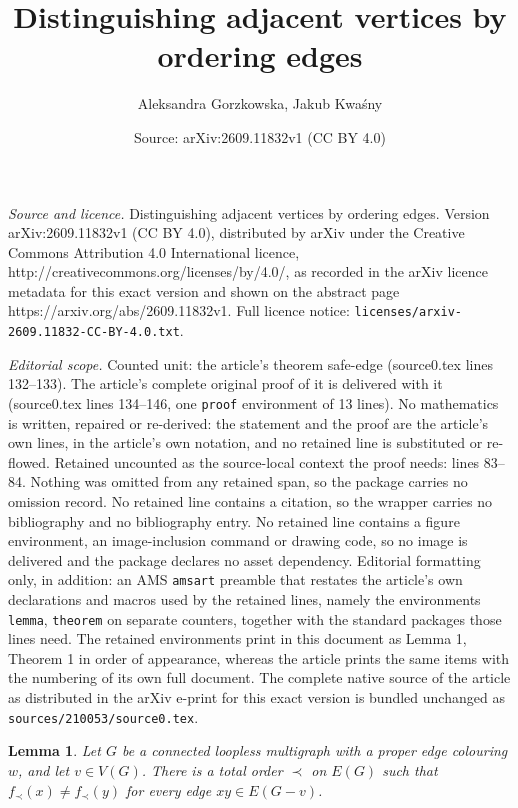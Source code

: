 \documentclass[10pt,a4paper]{amsart}
\title{Distinguishing adjacent vertices by ordering edges}
\author{Aleksandra Gorzkowska, Jakub Kwa\'sny}
\date{Source: arXiv:2609.11832v1 (CC BY 4.0)}
\newtheorem{lemma}{Lemma}
\begin{document}
\maketitle

\noindent\emph{Source and licence.} Distinguishing adjacent vertices by ordering edges. Version arXiv:2609.11832v1 (CC BY 4.0), distributed by arXiv under the Creative Commons Attribution 4.0 International licence, http://creativecommons.org/licenses/by/4.0/, as recorded in the arXiv licence metadata for this exact version and shown on the abstract page https://arxiv.org/abs/2609.11832v1. Full licence notice: \texttt{licenses/arxiv-2609.11832-CC-BY-4.0.txt}.\par\smallskip

\noindent\textit{Editorial scope.} Counted unit: the article's theorem safe-edge (source0.tex lines 132--133). The article's complete original proof of it is delivered with it (source0.tex lines 134--146, one \texttt{proof} environment of 13 lines). No mathematics is written, repaired or re-derived: the statement and the proof are the article's own lines, in the article's own notation, and no retained line is substituted or re-flowed.  Retained uncounted as the source-local context the proof needs: lines 83--84.  Nothing was omitted from any retained span, so the package carries no omission record.  No retained line contains a citation, so the wrapper carries no bibliography and no bibliography entry.  No retained line contains a figure environment, an image-inclusion command or drawing code, so no image is delivered and the package declares no asset dependency.  Editorial formatting only, in addition: an AMS \texttt{amsart} preamble that restates the article's own declarations and macros used by the retained lines, namely the environments \texttt{lemma}, \texttt{theorem} on separate counters, together with the standard packages those lines need.  The retained environments print in this document as Lemma 1, Theorem 1 in order of appearance, whereas the article prints the same items with the numbering of its own full document.  The complete native source of the article as distributed in the arXiv e-print for this exact version is bundled unchanged as \texttt{sources/210053/source0.tex}.
\begin{lemma} Let $G$ be a connected loopless multigraph with a proper edge colouring $w$, and let $v\in V(G)$. There is a total order $\prec$ on $E(G)$ such that $f_{\prec}(x)\neq f_{\prec}(y)$ for every edge $xy\in E(G-v)$. \label{lem: single_bad_vertex}
\end{lemma}
\end{document}
